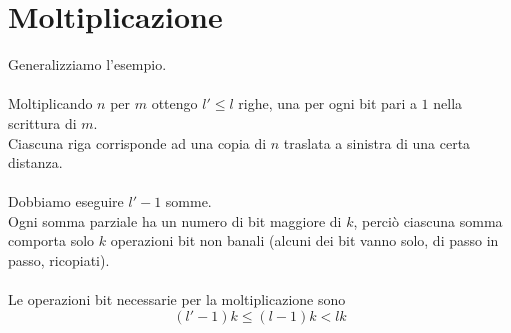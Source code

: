 \documentclass[a4paper,12pt, oneside]{book}
\begin{document}
\section{Moltiplicazione}
Generalizziamo l'esempio.\\\\
Moltiplicando $n$ per $m$ ottengo $l' \leq l$ righe, una per ogni bit pari a $1$ nella scrittura di $m$.\\ Ciascuna riga corrisponde ad una copia di $n$ traslata a sinistra di una certa distanza.\\\\
Dobbiamo eseguire $l'-1$ somme.\\ Ogni somma parziale ha un numero di bit maggiore di $k$, perciò ciascuna somma comporta solo $k$ operazioni bit non banali (alcuni dei bit vanno solo, di passo in passo, ricopiati).\\\\
Le operazioni bit necessarie per la moltiplicazione sono $$(l'-1)k \leq (l-1)k < lk$$
\end{document}
